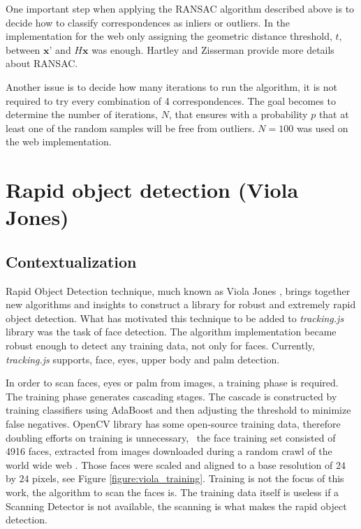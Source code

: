 One important step when applying the RANSAC algorithm described above is to decide how to classify correspondences as inliers or outliers. In the implementation for the web only assigning the geometric distance threshold, $t$, between $\textbf{x'}$ and $H\textbf{x}$ was enough. Hartley and Zisserman \cite{Hartley2004} provide more details about RANSAC.

Another issue is to decide how many iterations to run the algorithm, it is not required to try every combination of 4 correspondences. The goal becomes to determine the number of iterations, $N$, that ensures with a probability $p$ that at least one of the random samples will be free from outliers. $N=100$ was used on the web implementation.



\section{Rapid object detection (Viola Jones)} %
\label{sec:tracking_library_for_the_web:rapid_object_detection}

\subsection{Contextualization} %
\label{sub:tracking_library_for_the_web:rapid_object_detection:contextualization}

Rapid Object Detection technique, much known as Viola Jones \cite{Viola2001}, brings together new algorithms and insights to construct a library for robust and extremely rapid object detection. What has motivated this technique to be added to \textit{tracking.js} library was the task of face detection. The algorithm implementation became robust enough to detect any training data, not only for faces. Currently, \textit{tracking.js} supports, face, eyes, upper body and palm detection.

In order to scan faces, eyes or palm from images, a training phase is required. The training phase generates cascading stages. The cascade is constructed by training classifiers using AdaBoost \cite{Viola2001} and then adjusting the threshold to minimize false negatives. OpenCV library \cite{Bradski2000} has some open-source training data, therefore doubling efforts on training is unnecessary, \ie\ the face training set consisted of 4916 faces, extracted from images downloaded during a random crawl of the world wide web \cite{Viola2001}. Those faces were scaled and aligned to a base resolution of $24$ by $24$ pixels, see Figure \ref{figure:viola_training}. Training is not the focus of this work, the algorithm to scan the faces is. The training data itself is useless if a Scanning Detector is not available, the scanning is what makes the rapid object detection.

